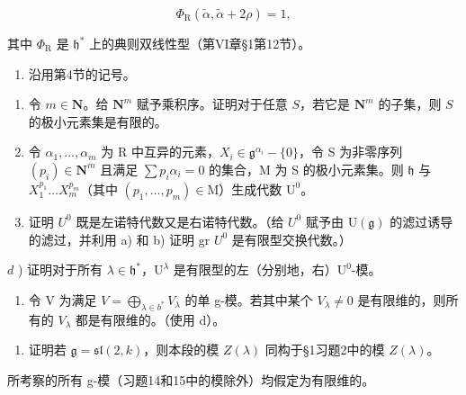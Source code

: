 \[
\varPhi_ {\mathrm{R}} (\tilde {\alpha}, \tilde {\alpha} + 2 \rho) = 1,
\]

其中 \(\Phi_{\mathrm{R}}\) 是 \(\mathfrak{h}^*\) 上的典则双线性型（第VI章§1第12节）。

\begin{enumerate}
\def\labelenumi{\arabic{enumi})}
\setcounter{enumi}{3}
\tightlist
\item
  沿用第4节的记号。
\end{enumerate}

\begin{enumerate}
\def\labelenumi{\alph{enumi})}
\item
  令 \(m \in \mathbf{N}\)。给 \(\mathbf{N}^m\) 赋予乘积序。证明对于任意 \(S\)，若它是 \(\mathbf{N}^m\) 的子集，则 \(S\) 的极小元素集是有限的。
\item
  令 \(\alpha_{1},\ldots ,\alpha_{m}\) 为 R 中互异的元素，\(X_{i}\in \mathfrak{g}^{\alpha_{i}} - \{0\}\)，令 S 为非零序列 \((p_i)\in \mathbf{N}^m\) 且满足 \(\sum p_i\alpha_i = 0\) 的集合，M 为 S 的极小元素集。则 \(\mathfrak{h}\) 与 \(X_1^{p_1}\dots X_m^{p_m}\)（其中 \((p_1,\dots ,p_m)\in \mathrm{M}\)）生成代数 \(\mathrm{U}^0\)。
\item
  证明 \(U^{0}\) 既是左诺特代数又是右诺特代数。（给 \(U^{0}\) 赋予由 \(\mathrm{U}(\mathfrak{g})\) 的滤过诱导的滤过，并利用 a) 和 b) 证明 gr \(U^{0}\) 是有限型交换代数。）
\end{enumerate}

\(d\) ) 证明对于所有 \(\lambda \in \mathfrak{h}^*\)，\(\mathrm{U}^{\lambda}\) 是有限型的左（分别地，右）\(\mathrm{U}^0\)-模。

\begin{enumerate}
\def\labelenumi{\alph{enumi})}
\setcounter{enumi}{4}
\tightlist
\item
  令 V 为满足 \(V = \bigoplus_{\lambda \in b^{*}} V_{\lambda}\) 的单 g-模。若其中某个 \(V_{\lambda} \neq 0\) 是有限维的，则所有的 \(V_{\lambda}\) 都是有限维的。（使用 d）。
\end{enumerate}

\begin{enumerate}
\def\labelenumi{\arabic{enumi})}
\setcounter{enumi}{4}
\tightlist
  \item
  证明若 \(\mathfrak{g} = \mathfrak{sl}(2,k)\)，则本段的模 \(Z(\lambda)\) 同构于§1习题2中的模 \(Z(\lambda)\)。
\end{enumerate}


所考察的所有 g-模（习题14和15中的模除外）均假定为有限维的。

